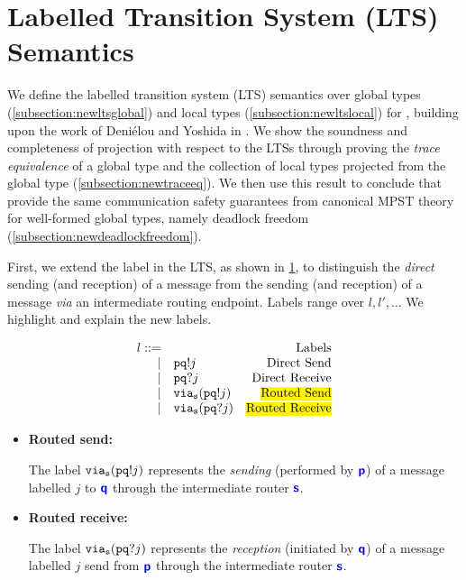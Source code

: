 \section{Labelled Transition System (LTS) Semantics}
\label{section:lts}

We define the labelled transition system (LTS) semantics
over global types (\cref{subsection:newltsglobal}) 
and local types (\cref{subsection:newltslocal})
for \newtheory,
building upon the work of Deni\'elou and Yoshida in
\cite{characterisation}.
We show the soundness and completeness of projection
with respect to the LTSs through proving the
\textit{trace equivalence} of
a global type and the collection of local types projected
from the global type (\cref{subsection:newtraceeq}).
We then use this result to
conclude that \newtheory provide the same
communication safety guarantees from canonical
MPST theory for well-formed global types, 
namely deadlock freedom (\cref{subsection:newdeadlockfreedom}).

First, we extend the label in the LTS, as shown in 
\cref{fig:newlts}, to distinguish
the \textit{direct} sending (and reception) of a message
from the sending (and reception) of a message
\textit{via} an intermediate routing endpoint.
Labels range over $l, l', \dots$
We highlight and explain the new labels.

\begin{figure}[!h]
\doublespacing
\[
\begin{array}{rlr}
l ::= & & \text{Labels} \\
	\mid & \aout{p}{q}{j} & 
		\text{Direct Send} \\
	\mid & \ain{p}{q}{j} & 
		\text{Direct Receive} \\
	\mid & \via{s}{\aout{p}{q}{j}} & 
		\text{\hl{Routed Send}} \\
	\mid & \via{s}{\ain{p}{q}{j}} & 
		\text{\hl{Routed Receive}} \\
\end{array}
\]
\singlespacing
{}
\label{fig:newlts}
\end{figure}

\begin{itemize}
\item \textbf{Routed send:}

The label ${\texttt{via}_{{\mathtt{s}}}({{\mathtt{p}}{\mathtt{q}}!{j}})}$ represents the
\textit{sending} (performed by ${\color{blue}\bm{\mathsf{p}}}$)
of a message labelled $j$ to ${\color{blue}\bm{\mathsf{q}}}$ through
the intermediate router ${\color{blue}\bm{\mathsf{s}}}$.

\item \textbf{Routed receive:}

The label ${\texttt{via}_{{\mathtt{s}}}({{\mathtt{p}}{\mathtt{q}}?{j}})}$ represents the
\textit{reception} (initiated by ${\color{blue}\bm{\mathsf{q}}}$) 
of a message labelled $j$
send from ${\color{blue}\bm{\mathsf{p}}}$ through
the intermediate router ${\color{blue}\bm{\mathsf{s}}}$.
\end{itemize}

